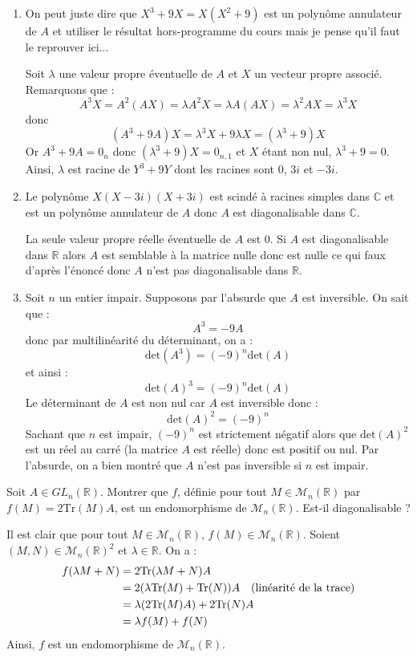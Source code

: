 \documentclass[a4paper,10pt]{report}
\begin{document}
\begin{enumerate}
\item On peut juste dire que $X^3+9X=X(X^2+9)$ est un polynôme annulateur de $A$ et utiliser le résultat hors-programme du cours mais je pense qu'il faut le reprouver ici...

\medskip

\noindent Soit $\lambda$ une valeur propre éventuelle de $A$ et $X$ un vecteur propre associé. Remarquons que :
$$ A^3 X= A^2(AX)= \lambda A^2X = \lambda A(AX) = \lambda^2 AX = \lambda^3 X$$
donc
$$ (A^3+9A)X = \lambda ^3 X+ 9 \lambda X = (\lambda^3+9)X$$
Or $ A^3+9A=0_n$ donc $(\lambda^3+9)X= 0_{n,1}$ et $X$ étant non nul, $\lambda^3+9=0$. Ainsi, $\lambda$ est racine de $Y^3+9Y$ dont les racines sont $0$, $3i$ et $-3i$.
\item Le polynôme $X(X-3i)(X+3i)$ est scindé à racines simples dans $\mathbb{C}$ et est un polynôme annulateur de $A$ donc $A$ est diagonalisable dans $\mathbb{C}$.

\medskip

\noindent La seule valeur propre réelle éventuelle de $A$ est $0$. Si $A$ est diagonalisable dans $\mathbb{R}$ alors $A$ est semblable à la matrice nulle donc est nulle ce qui faux d'après l'énoncé donc $A$ n'est pas diagonalisable dans $\mathbb{R}$.

\item Soit $n$ un entier impair. Supposons par l'absurde que $A$ est inversible. On sait que :
$$ A^3 = -9A$$
donc par multilinéarité du déterminant, on a :
$$ \textrm{det}(A^3) = (-9)^n \textrm{det}(A)$$
et ainsi :
$$ \textrm{det}(A)^3 = (-9)^n \textrm{det}(A)$$
Le déterminant de $A$ est non nul car $A$ est inversible donc :
$$ \textrm{det}(A)^2 = (-9)^n $$
Sachant que $n$ est impair, $(-9)^n$ est strictement négatif alors que $\textrm{det}(A)^2$ est un réel au carré (la matrice $A$ est réelle) donc est positif ou nul. Par l'absurde, on a bien montré que $A$ n'est pas inversible si $n$ est impair. 
\end{enumerate}

\begin{Exa} Soit $A \in GL_n(\mathbb{R})$. Montrer que $f$, définie pour tout $M \in \mathcal{M}_n(\mathbb{R})$ par $f(M)= 2 \textrm{Tr}(M) A$, est un endomorphisme de $\mathcal{M}_n(\mathbb{R})$. Est-il diagonalisable ?
\end{Exa}

\corr Il est clair que pour tout $M \in \mathcal{M}_n(\mathbb{R})$, $f(M) \in \mathcal{M}_n(\mathbb{R})$. Soient $(M,N) \in \mathcal{M}_n(\mathbb{R})^2$ et $\lambda \in \mathbb{R}$. On a :
\begin{align*}
f(\lambda M + N) & = 2 \textrm{Tr}(\lambda M + N) A \\
& = 2 (\lambda \textrm{Tr}(M) +  \textrm{Tr}(N))A \quad \hbox{(linéarité de la trace)} \\
& =\lambda (2 \textrm{Tr}(M)A) + 2 \textrm{Tr}(N)A \\
&= \lambda f(M) + f(N)
\end{align*}
Ainsi, $f$ est un endomorphisme de $\mathcal{M}_n(\mathbb{R})$.
\end{document}
